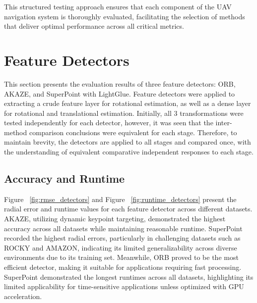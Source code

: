     
This structured testing approach ensures that each component of the UAV navigation system is thoroughly evaluated, facilitating the selection of methods that deliver optimal performance across all critical metrics.





\section{Feature Detectors}

This section presents the evaluation results of three feature detectors: ORB, AKAZE, and SuperPoint with LightGlue. Feature detectors were applied to extracting a crude feature layer for rotational estimation, as well as a dense layer for rotational and translational estimation. Initially, all 3 transformations were tested independently for each detector, however, it was seen that the inter-method comparison conclusions were equivalent for each stage. Therefore, to maintain brevity, the detectors are applied to all stages and compared once, with the understanding of equivalent comparative independent responses to each stage.

\subsection{Accuracy and Runtime}

Figure ~\ref{fig:rmse_detectors} and Figure ~\ref{fig:runtime_detectors} present the radial error and runtime values for each feature detector across different datasets. AKAZE, utilizing dynamic keypoint targeting, demonstrated the highest accuracy across all datasets while maintaining reasonable runtime. SuperPoint recorded the highest radial errors, particularly in challenging datasets such as ROCKY and AMAZON, indicating its limited generalizability across diverse environments due to its training set. Meanwhile, ORB proved to be the most efficient detector, making it suitable for applications requiring fast processing. SuperPoint demonstrated the longest runtimes across all datasets, highlighting its limited applicability for time-sensitive applications unless optimized with GPU acceleration.

